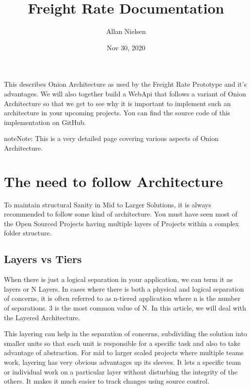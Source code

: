 \documentclass[letterpaper,10pt,english]{sphinxmanual}
\title{Freight Rate Documentation}
\date{Nov 30, 2020}
\author{Allan Nielsen}
\begin{document}
\pagestyle{empty}
\sphinxmaketitle
\pagestyle{plain}
\sphinxtableofcontents
\pagestyle{normal}
\label{\detokenize{index::doc}}


This describes Onion Architecture as used by the Freight Rate Prototype and it’s advantages.
We will also together build a WebApi that follows a variant of Onion Architecture so that we get to see why it is important to implement
such an architecture in your upcoming projects. You can find the source code of this implementation on GitHub.

\begin{sphinxadmonition}{note}{Note:}
This is a very detailed page covering various aspects of Onion Architecture.
\end{sphinxadmonition}


\chapter{The need to follow Architecture}
\label{\detokenize{OnionArchitecture/details:the-need-to-follow-architecture}}\label{\detokenize{OnionArchitecture/details::doc}}
To maintain structural Sanity in Mid to Larger Solutions, it is always recommended to follow some kind of architecture. You must have seen most of the Open Sourced Projects having multiple layers of Projects within a complex folder structure.


\section{Layers vs Tiers}
\label{\detokenize{OnionArchitecture/details:layers-vs-tiers}}
When there is just a logical separation in your application, we can term it as layers or N Layers. In cases where there is both a physical and logical separation of concerns, it is often referred to as n-tiered application where n is the number of separations. 3 is the most common value of N. In this article, we will deal with the Layered Architecture.

This layering can help in the separation of concerns, subdividing the solution into smaller units so that each unit is responsible for a specific task and also to take advantage of abstraction. For mid to larger scaled projects where multiple teams work, layering has very obvious advantages up its sleeves. It lets a specific team or individual work on a particular layer without disturbing the integrity of the others. It makes it much easier to track changes using source control.
\end{document}
